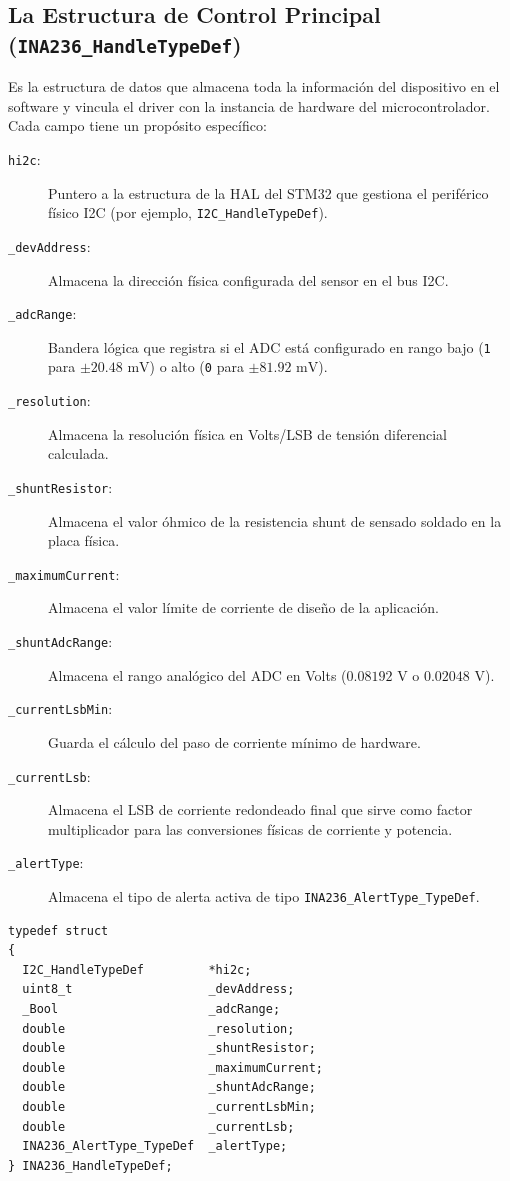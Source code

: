 \documentclass[
10pt, %
a4paper, %
oneside, %
headinclude,footinclude, %
BCOR5mm, %
]{scrartcl}
\begin{document}
\subsection{La Estructura de Control Principal (\texttt{INA236\_HandleTypeDef})}
Es la estructura de datos que almacena toda la información del dispositivo en el software y vincula el driver con la instancia de hardware del microcontrolador. Cada campo tiene un propósito específico:

\begin{description}
	\item[\texttt{hi2c}:] Puntero a la estructura de la HAL del STM32 que gestiona el periférico físico I2C (por ejemplo, \texttt{I2C\_HandleTypeDef}).
	\item[\texttt{\_devAddress}:] Almacena la dirección física configurada del sensor en el bus I2C.
	\item[\texttt{\_adcRange}:] Bandera lógica que registra si el ADC está configurado en rango bajo (\texttt{1} para $\pm 20.48\text{ mV}$) o alto (\texttt{0} para $\pm 81.92\text{ mV}$).
	\item[\texttt{\_resolution}:] Almacena la resolución física en Volts/LSB de tensión diferencial calculada.
	\item[\texttt{\_shuntResistor}:] Almacena el valor óhmico de la resistencia shunt de sensado soldado en la placa física.
	\item[\texttt{\_maximumCurrent}:] Almacena el valor límite de corriente de diseño de la aplicación.
	\item[\texttt{\_shuntAdcRange}:] Almacena el rango analógico del ADC en Volts ($0.08192\text{ V}$ o $0.02048\text{ V}$).
	\item[\texttt{\_currentLsbMin}:] Guarda el cálculo del paso de corriente mínimo de hardware.
	\item[\texttt{\_currentLsb}:] Almacena el LSB de corriente redondeado final que sirve como factor multiplicador para las conversiones físicas de corriente y potencia.
	\item[\texttt{\_alertType}:] Almacena el tipo de alerta activa de tipo \texttt{INA236\_AlertType\_TypeDef}.
\end{description}

\begin{lstlisting}[style=CMakeStyle]
typedef struct 
{
  I2C_HandleTypeDef         *hi2c;
  uint8_t                   _devAddress;
  _Bool                     _adcRange;
  double                    _resolution;
  double                    _shuntResistor;
  double                    _maximumCurrent;
  double                    _shuntAdcRange;
  double                    _currentLsbMin;
  double                    _currentLsb;
  INA236_AlertType_TypeDef  _alertType;
} INA236_HandleTypeDef;
\end{lstlisting}
\end{document}
